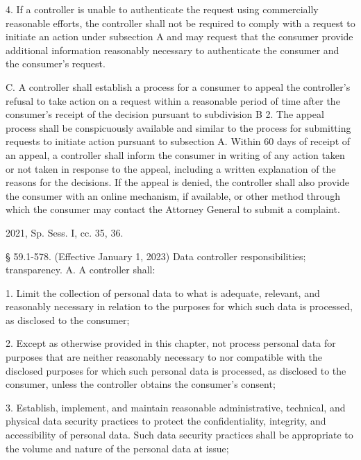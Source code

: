 4. If a controller is unable to authenticate the request using commercially reasonable efforts, the controller shall not be required to comply with a request to initiate an action under subsection A and may request that the consumer provide additional information reasonably necessary to authenticate the consumer and the consumer's request.

C. A controller shall establish a process for a consumer to appeal the controller's refusal to take action on a request within a reasonable period of time after the consumer's receipt of the decision pursuant to subdivision B 2. The appeal process shall be conspicuously available and similar to the process for submitting requests to initiate action pursuant to subsection A. Within 60 days of receipt of an appeal, a controller shall inform the consumer in writing of any action taken or not taken in response to the appeal, including a written explanation of the reasons for the decisions. If the appeal is denied, the controller shall also provide the consumer with an online mechanism, if available, or other method through which the consumer may contact the Attorney General to submit a complaint.

2021, Sp. Sess. I, cc. 35, 36.

§ 59.1-578. (Effective January 1, 2023) Data controller responsibilities; transparency.
A. A controller shall:

1. Limit the collection of personal data to what is adequate, relevant, and reasonably necessary in relation to the purposes for which such data is processed, as disclosed to the consumer;

2. Except as otherwise provided in this chapter, not process personal data for purposes that are neither reasonably necessary to nor compatible with the disclosed purposes for which such personal data is processed, as disclosed to the consumer, unless the controller obtains the consumer's consent;

3. Establish, implement, and maintain reasonable administrative, technical, and physical data security practices to protect the confidentiality, integrity, and accessibility of personal data. Such data security practices shall be appropriate to the volume and nature of the personal data at issue;

